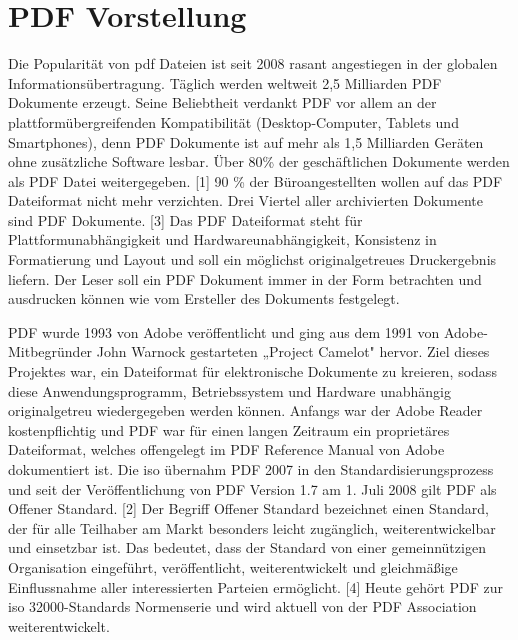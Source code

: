 \section{PDF Vorstellung}
Die Popularität von \gls{pdf} Dateien ist seit 2008 rasant angestiegen in der globalen Informationsübertragung. Täglich werden weltweit 2,5 Milliarden PDF Dokumente erzeugt. Seine Beliebtheit verdankt PDF vor allem an der plattformübergreifenden Kompatibilität (Desktop-Computer, Tablets und Smartphones), denn PDF Dokumente ist auf mehr als 1,5 Milliarden Geräten ohne zusätzliche Software lesbar. Über 80\% der geschäftlichen Dokumente werden als PDF Datei weitergegeben. [1] 90 \% der Büroangestellten wollen auf das PDF Dateiformat nicht mehr verzichten. Drei Viertel aller archivierten Dokumente sind PDF Dokumente. [3] Das PDF Dateiformat steht für Plattformunabhängigkeit und Hardwareunabhängigkeit, Konsistenz in Formatierung und Layout und soll ein möglichst originalgetreues Druckergebnis liefern. Der Leser soll ein PDF Dokument immer in der Form betrachten und ausdrucken können wie vom Ersteller des Dokuments festgelegt.
\par
PDF wurde 1993 von Adobe veröffentlicht und ging aus dem 1991 von Adobe-Mitbegründer John Warnock gestarteten „Project Camelot" hervor. Ziel dieses Projektes war, ein Dateiformat für elektronische Dokumente zu kreieren, sodass diese Anwendungsprogramm, Betriebssystem und Hardware unabhängig originalgetreu wiedergegeben werden können. Anfangs war der Adobe Reader kostenpflichtig und PDF war für einen langen Zeitraum ein proprietäres Dateiformat, welches offengelegt im PDF Reference Manual von Adobe dokumentiert ist. Die \gls{iso} übernahm PDF 2007 in den Standardisierungsprozess und seit der Veröffentlichung von PDF Version 1.7 am 1. Juli 2008 gilt PDF als Offener Standard. [2] Der Begriff Offener Standard bezeichnet einen Standard, der für alle Teilhaber am Markt besonders leicht zugänglich, weiterentwickelbar und einsetzbar ist. Das bedeutet, dass der Standard von einer gemeinnützigen Organisation eingeführt, veröffentlicht, weiterentwickelt und gleichmäßige Einflussnahme aller interessierten Parteien ermöglicht. [4] Heute gehört PDF zur \gls{iso} 32000-Standards Normenserie und wird aktuell von der PDF Association weiterentwickelt.

